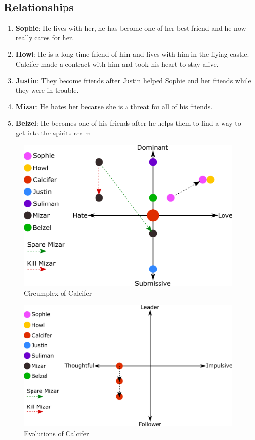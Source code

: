 \subsection{Relationships}
\begin{enumerate}
\item \textbf{Sophie}: He lives with her, he has become one of her best friend and he now really cares for her.
\item \textbf{Howl}: He is a long-time friend of him and lives with him in the flying castle. Calcifer made a contract with him and took his heart to stay alive.
\item \textbf{Justin}: They become friends after Justin helped Sophie and her friends while they were in trouble.
\item \textbf{Mizar}: He hates her because she is a threat for all of his friends.
\item \textbf{Belzel}: He becomes one of his friends after he helps them to find a way to get into the spirits realm.
\end{enumerate}

\begin{figure}[H]
  \centering
  \includegraphics[width=14cm]{Images/Diagrams/Circumplexes/calciferCircumplex}
  \caption{Circumplex of Calcifer}
\end{figure}

\begin{figure}[H]
  \centering
   \includegraphics[width=14cm]{Images/Diagrams/Evolutions/calciferEvolution}
  \caption{Evolutions of Calcifer}
\end{figure}

